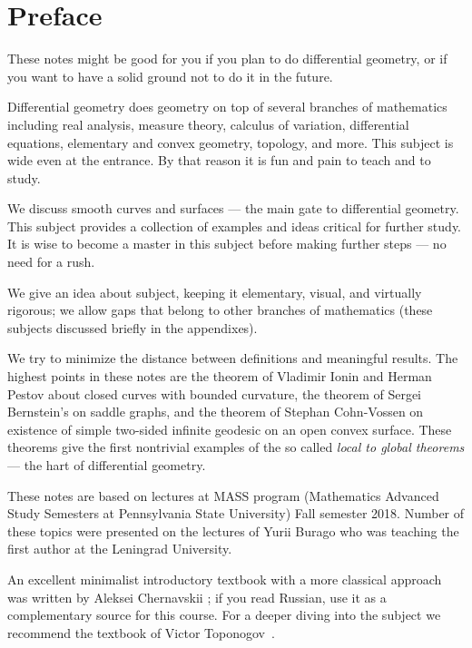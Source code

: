 
\chapter*{Preface}

These notes might be good for you if you plan to do differential geometry,
or if you want to have a solid ground not to do it in the future.

Differential geometry does geometry on top of several branches of mathematics including 
real analysis, 
measure theory,
calculus of variation,
differential equations,
elementary and convex geometry,
topology, and more.
This subject is wide even at the entrance. 
By that reason it is fun and pain to teach and to study.

We discuss smooth curves and surfaces --- the main gate to differential geometry.
This subject provides a collection of examples and ideas critical for further study.
It is wise to become a master in this subject before making further steps --- no need for a rush.

We give an idea about subject, keeping it elementary, visual, and virtually rigorous; we allow gaps that belong to other branches of mathematics (these subjects discussed briefly in the appendixes).

We try to minimize the distance between definitions and meaningful results.
The highest points in these notes are
the theorem of Vladimir Ionin and Herman Pestov about closed curves with bounded curvature,
the theorem of Sergei Bernstein's on saddle graphs,
and the theorem of Stephan Cohn-Vossen on existence of simple two-sided infinite geodesic on an open convex surface.
These theorems give the first nontrivial examples of the so called \emph{local to global theorems} --- the hart of differential geometry. 

These notes are based on lectures at MASS program (Mathematics Advanced Study Semesters at Pennsylvania State University) Fall semester 2018.
Number of these topics were presented on the lectures of Yurii Burago who was teaching the first author at the Leningrad University.

An excellent minimalist introductory textbook with a more classical approach was written by Aleksei Chernavskii \cite{chernavsky};
if you read Russian, use it as a complementary source for this course. 
For a deeper diving into the subject we recommend the textbook of Victor Toponogov~\cite{toponogov}.


\newpage
\tableofcontents
